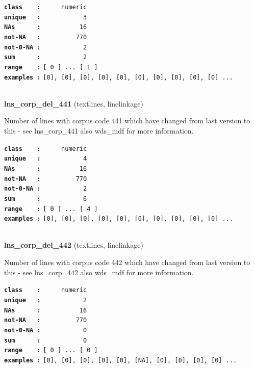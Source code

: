 \documentclass[]{article}
\begin{document}
\textbf{\texttt{class\ \ \ \ :}} \texttt{~~~~~numeric}\\
\textbf{\texttt{unique\ \ \ :}} \texttt{~~~~~~~~~~~3}\\
\textbf{\texttt{NAs\ \ \ \ \ \ :}} \texttt{~~~~~~~~~~16}\\
\textbf{\texttt{not-NA\ \ \ :}} \texttt{~~~~~~~~~770}\\
\textbf{\texttt{not-0-NA\ :}} \texttt{~~~~~~~~~~~2}\\
\textbf{\texttt{sum\ \ \ \ \ \ :}} \texttt{~~~~~~~~~~~2}\\
\textbf{\texttt{range\ \ \ \ :}}
\texttt{{[}\ 0\ {]}\ ...\ {[}\ 1\ {]}}\\
\textbf{\texttt{examples\ :}}
\texttt{{[}0{]},\ {[}0{]},\ {[}0{]},\ {[}0{]},\ {[}0{]},\ {[}0{]},\ {[}0{]},\ {[}0{]},\ {[}0{]},\ {[}0{]}\ ...}\\

~

\textbf{lns\_corp\_del\_441} (textlines, linelinkage)

Number of lines with corpus code 441 which have changed from last
version to this - see lns\_corp\_441 also wds\_mdf for more information.

\textbf{\texttt{class\ \ \ \ :}} \texttt{~~~~~numeric}\\
\textbf{\texttt{unique\ \ \ :}} \texttt{~~~~~~~~~~~4}\\
\textbf{\texttt{NAs\ \ \ \ \ \ :}} \texttt{~~~~~~~~~~16}\\
\textbf{\texttt{not-NA\ \ \ :}} \texttt{~~~~~~~~~770}\\
\textbf{\texttt{not-0-NA\ :}} \texttt{~~~~~~~~~~~2}\\
\textbf{\texttt{sum\ \ \ \ \ \ :}} \texttt{~~~~~~~~~~~6}\\
\textbf{\texttt{range\ \ \ \ :}}
\texttt{{[}\ 0\ {]}\ ...\ {[}\ 4\ {]}}\\
\textbf{\texttt{examples\ :}}
\texttt{{[}0{]},\ {[}0{]},\ {[}0{]},\ {[}0{]},\ {[}0{]},\ {[}0{]},\ {[}0{]},\ {[}0{]},\ {[}0{]},\ {[}0{]}\ ...}\\

~

\textbf{lns\_corp\_del\_442} (textlines, linelinkage)

Number of lines with corpus code 442 which have changed from last
version to this - see lns\_corp\_442 also wds\_mdf for more information.

\textbf{\texttt{class\ \ \ \ :}} \texttt{~~~~~numeric}\\
\textbf{\texttt{unique\ \ \ :}} \texttt{~~~~~~~~~~~2}\\
\textbf{\texttt{NAs\ \ \ \ \ \ :}} \texttt{~~~~~~~~~~16}\\
\textbf{\texttt{not-NA\ \ \ :}} \texttt{~~~~~~~~~770}\\
\textbf{\texttt{not-0-NA\ :}} \texttt{~~~~~~~~~~~0}\\
\textbf{\texttt{sum\ \ \ \ \ \ :}} \texttt{~~~~~~~~~~~0}\\
\textbf{\texttt{range\ \ \ \ :}}
\texttt{{[}\ 0\ {]}\ ...\ {[}\ 0\ {]}}\\
\textbf{\texttt{examples\ :}}
\texttt{{[}0{]},\ {[}0{]},\ {[}0{]},\ {[}0{]},\ {[}0{]},\ {[}NA{]},\ {[}0{]},\ {[}0{]},\ {[}0{]},\ {[}0{]}\ ...}\\
\end{document}
